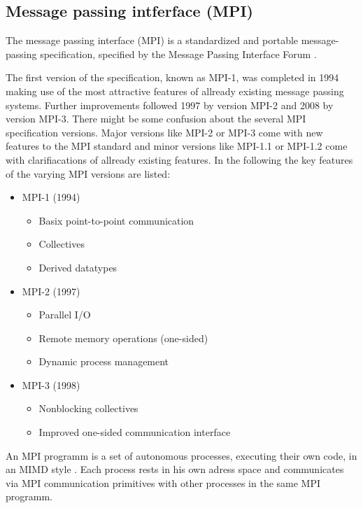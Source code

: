 \subsection{Message passing intferface (MPI)}
\label{sec:mpi}

The message passing interface (MPI) is a standardized and portable
message-passing specification, specified by the Message Passing
Interface Forum \cite{ref:mpi_specification}.

The first version of the specification, known as MPI-1, was completed
in 1994 making use of the most attractive features of allready
existing message passing systems.  Further improvements followed 1997
by version MPI-2 and 2008 by version MPI-3. There might be some
confusion about the several MPI specification versions. Major versions
like MPI-2 or MPI-3 come with new features to the MPI standard and
minor versions like MPI-1.1 or MPI-1.2 come with clarifiacations of
allready existing features.  In the following the key features of the
varying MPI versions are listed:

\begin{itemize}
  \item MPI-1 (1994)
    \begin{itemize}
      \item Basix point-to-point communication
      \item Collectives
      \item Derived datatypes
    \end{itemize}
  \item MPI-2 (1997)
    \begin{itemize}
      \item Parallel I/O
      \item Remote memory operations (one-sided)
      \item Dynamic process management
    \end{itemize}
  \item MPI-3 (1998)
    \begin{itemize}
      \item Nonblocking collectives
      \item Improved one-sided communication interface
    \end{itemize}
\end{itemize}

An MPI programm is a set of autonomous processes, executing their own
code, in an MIMD style \cite{Flynn:1972:COE:1952456.1952459}.  Each
process rests in his own adress space and communicates via MPI
communication primitives with other processes in the same MPI
programm. 

